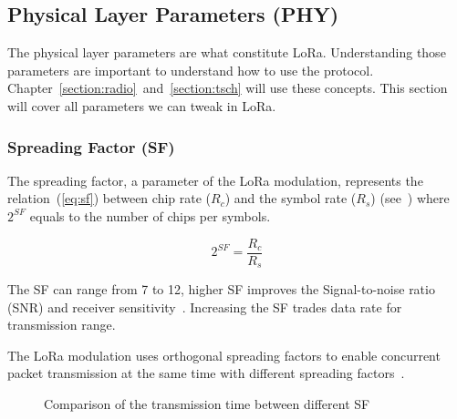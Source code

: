 \subsection{Physical Layer Parameters (PHY)}

The physical layer parameters are what constitute LoRa. 
Understanding those parameters are important to understand how to use the
protocol.
Chapter~\ref{section:radio}~and~\ref{section:tsch} will use these concepts.
This section will cover all parameters we can tweak in LoRa.

\subsubsection{Spreading Factor (SF)}

The spreading factor, a parameter of the LoRa modulation, represents the
relation~(\ref{eq:sf}) between chip rate ($R_{c}$) and the symbol rate ($R_{s}$)
(see~\cite{semtech:modemdesign}) where $2^{SF}$ equals to the number of chips per
symbols.

\begin{equation}
 \label{eq:sf} 
  2^{SF} = \frac{R_c}{R_s}
\end{equation}

The SF can range from 7 to 12, higher SF improves the Signal-to-noise ratio
(SNR) and receiver sensitivity~\cite{semtech:modemdesign}.
Increasing the SF trades data rate for transmission range.

The LoRa modulation uses orthogonal spreading factors to enable concurrent
packet transmission at the same time with different
spreading factors~\cite{semtech:modulationbasics}.

\begin{figure}[H]
\centering
{} 
\caption{Comparison of the transmission time between different SF\label{fig:sfcomp}}
\end{figure}

